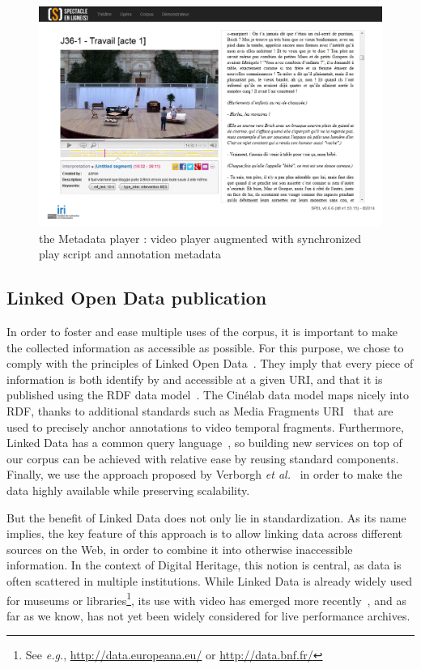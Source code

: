 \documentclass[conference]{IEEEtran}
\begin{document}
\begin{figure}[htb!]
  \centering
  \includegraphics[width=\columnwidth]{mdplayer}
  \caption{the Metadata player : video player augmented with synchronized play script and annotation metadata}
  \label{fig:mdplayer}
\end{figure}

\subsection{Linked Open Data publication}
In order to foster and ease multiple uses of the corpus,
it is important to make the collected information as accessible as possible.
For this purpose, we chose to comply with the principles of Linked Open Data~\cite{bernerslee2006linkeddata}.
They imply that every piece of information is both identify by and accessible at a given URI, and that it is published using the RDF data model~\cite{cyganiak2014rdf11concepts}.
The Cinélab data model maps nicely into RDF, thanks to additional standards such as Media Fragments URI~\cite{troncy2012mediafragments} that are used to precisely anchor annotations to video temporal fragments. Furthermore, Linked Data has a common query language~\cite{prudhommeaux2008sparql}, so building new services on top of our corpus can be achieved with relative ease by reusing standard components. Finally, we use the approach proposed by Verborgh \emph{et al.}~\cite{verborgh2014querying} in order to make the data highly available while preserving scalability.

But the benefit of Linked Data does not only lie in standardization.
As its name implies, the key feature of this approach is to allow linking data across different sources on the Web, in order to combine it into otherwise inaccessible information.
In the context of Digital Heritage, this notion is central, as data is often scattered in multiple institutions.
While Linked Data is already widely used for museums or libraries\footnote{
See \emph{e.g.}, \url{http://data.europeana.eu/} or \url{http://data.bnf.fr/}},
its use with video has emerged more recently~\cite{vandeursen2012mediafragmentannotations,steiner2014webvtt},
and as far as we know, has not yet been widely considered for live performance archives.
\end{document}
